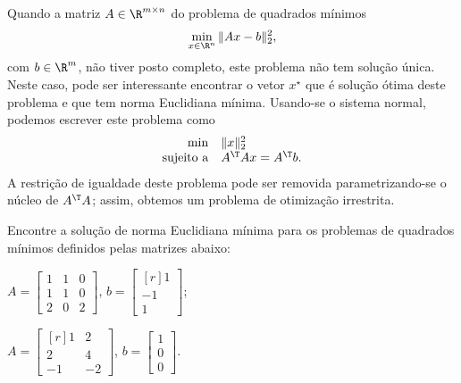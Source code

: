 \begin{problem}
Quando a matriz $A \in \R^{m \times n}$ do problema de quadrados mínimos
\[
\min_{x \in \R^n} \|Ax - b\|_2^2,
\]
com $b \in \R^m$, não tiver posto completo, este problema não tem solução única. Neste caso, pode ser interessante encontrar o vetor $x^\star$ que é solução ótima deste problema e que tem norma Euclidiana mínima. Usando-se o sistema normal, podemos escrever este problema como
\[
\begin{array}{rl}
\min & \|x\|_2^2\\
\textrm{sujeito a} & A^\T A x = A^\T b.
\end{array}
\]
A restrição de igualdade deste problema pode ser removida parametrizando-se o núcleo de $A^\T A$; assim, obtemos um problema de otimização irrestrita. 

Encontre a solução de norma Euclidiana mínima para os problemas de quadrados mínimos definidos pelas matrizes abaixo:

\begin{enumerate}[label=(\alph*)]
\begin{multicols}{2}
\item $A = \begin{bmatrix} 1 & 1 & 0 \\ 1 & 1 & 0 \\
2 & 0 & 2 \end{bmatrix}$, $b = \begin{bmatrix*}[r]
1 \\ -1 \\ 1
\end{bmatrix*}$;
\item $A = \begin{bmatrix*}[r] 1 & 2 \\ 2 & 4 \\ -1 & -2 \end{bmatrix*}$, $b = \begin{bmatrix}
1 \\ 0 \\ 0
\end{bmatrix}$.
\end{multicols}
\end{enumerate}
\end{problem}

